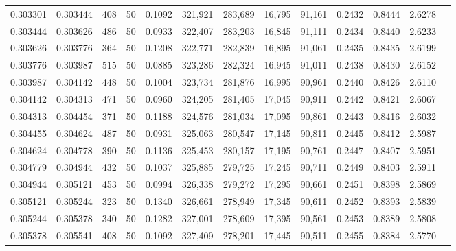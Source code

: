 \begin{tabular}{rrrrrrrrrrrrr}
0.303301 & 0.303444 &   408 &  50 &                                     0.1092 & 321,921 & 283,689 &  16,795 &  91,161 & 0.2432 & 0.8444 & 2.6278 \\
0.303444 & 0.303626 &   486 &  50 &                                     0.0933 & 322,407 & 283,203 &  16,845 &  91,111 & 0.2434 & 0.8440 & 2.6233 \\
0.303626 & 0.303776 &   364 &  50 &                                     0.1208 & 322,771 & 282,839 &  16,895 &  91,061 & 0.2435 & 0.8435 & 2.6199 \\
0.303776 & 0.303987 &   515 &  50 &                                     0.0885 & 323,286 & 282,324 &  16,945 &  91,011 & 0.2438 & 0.8430 & 2.6152 \\
0.303987 & 0.304142 &   448 &  50 &                                     0.1004 & 323,734 & 281,876 &  16,995 &  90,961 & 0.2440 & 0.8426 & 2.6110 \\
0.304142 & 0.304313 &   471 &  50 &                                     0.0960 & 324,205 & 281,405 &  17,045 &  90,911 & 0.2442 & 0.8421 & 2.6067 \\
0.304313 & 0.304454 &   371 &  50 &                                     0.1188 & 324,576 & 281,034 &  17,095 &  90,861 & 0.2443 & 0.8416 & 2.6032 \\
0.304455 & 0.304624 &   487 &  50 &                                     0.0931 & 325,063 & 280,547 &  17,145 &  90,811 & 0.2445 & 0.8412 & 2.5987 \\
0.304624 & 0.304778 &   390 &  50 &                                     0.1136 & 325,453 & 280,157 &  17,195 &  90,761 & 0.2447 & 0.8407 & 2.5951 \\
0.304779 & 0.304944 &   432 &  50 &                                     0.1037 & 325,885 & 279,725 &  17,245 &  90,711 & 0.2449 & 0.8403 & 2.5911 \\
0.304944 & 0.305121 &   453 &  50 &                                     0.0994 & 326,338 & 279,272 &  17,295 &  90,661 & 0.2451 & 0.8398 & 2.5869 \\
0.305121 & 0.305244 &   323 &  50 &                                     0.1340 & 326,661 & 278,949 &  17,345 &  90,611 & 0.2452 & 0.8393 & 2.5839 \\
0.305244 & 0.305378 &   340 &  50 &                                     0.1282 & 327,001 & 278,609 &  17,395 &  90,561 & 0.2453 & 0.8389 & 2.5808 \\
0.305378 & 0.305541 &   408 &  50 &                                     0.1092 & 327,409 & 278,201 &  17,445 &  90,511 & 0.2455 & 0.8384 & 2.5770 \\

\end{tabular}
